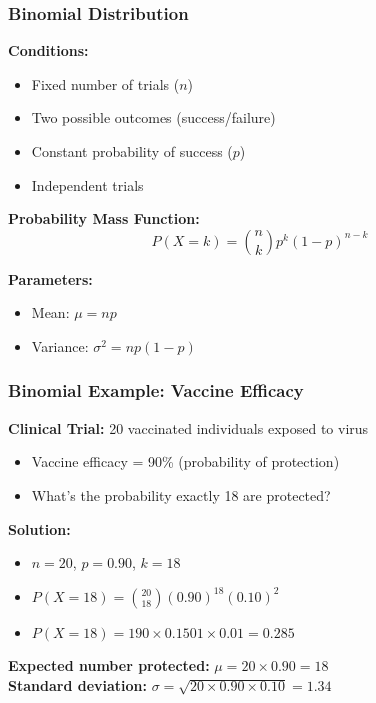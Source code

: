 \documentclass{beamer}
\begin{document}
\begin{frame}
\frametitle{Binomial Distribution}
\textbf{Conditions:}
\begin{itemize}
\item Fixed number of trials ($n$)
\item Two possible outcomes (success/failure)
\item Constant probability of success ($p$)
\item Independent trials
\end{itemize}

\vspace{0.5cm}
\textbf{Probability Mass Function:}
$$P(X = k) = \binom{n}{k} p^k (1-p)^{n-k}$$

\vspace{0.5cm}
\textbf{Parameters:}
\begin{itemize}
\item Mean: $\mu = np$
\item Variance: $\sigma^2 = np(1-p)$
\end{itemize}
\end{frame}

\begin{frame}
\frametitle{Binomial Example: Vaccine Efficacy}
\textbf{Clinical Trial:} 20 vaccinated individuals exposed to virus
\begin{itemize}
\item Vaccine efficacy = 90\% (probability of protection)
\item What's the probability exactly 18 are protected?
\end{itemize}

\vspace{0.5cm}
\textbf{Solution:}
\begin{itemize}
\item $n = 20$, $p = 0.90$, $k = 18$
\item $P(X = 18) = \binom{20}{18} (0.90)^{18} (0.10)^2$
\item $P(X = 18) = 190 \times 0.1501 \times 0.01 = 0.285$
\end{itemize}

\vspace{0.5cm}
\textbf{Expected number protected:} $\mu = 20 \times 0.90 = 18$\\
\textbf{Standard deviation:} $\sigma = \sqrt{20 \times 0.90 \times 0.10} = 1.34$
\end{frame}
\end{document}
